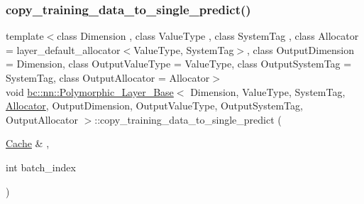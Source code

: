 \subsubsection{\texorpdfstring{copy\+\_\+training\+\_\+data\+\_\+to\+\_\+single\+\_\+predict()}{copy\_training\_data\_to\_single\_predict()}\hspace{0.1cm}{\footnotesize\ttfamily [1/2]}}
{\footnotesize\ttfamily template$<$class Dimension , class Value\+Type , class System\+Tag , class Allocator  = layer\+\_\+default\+\_\+allocator$<$\+Value\+Type, System\+Tag$>$, class Output\+Dimension  = Dimension, class Output\+Value\+Type  = Value\+Type, class Output\+System\+Tag  = System\+Tag, class Output\+Allocator  = Allocator$>$ \\
void \hyperlink{structbc_1_1nn_1_1Polymorphic__Layer__Base}{bc\+::nn\+::\+Polymorphic\+\_\+\+Layer\+\_\+\+Base}$<$ Dimension, Value\+Type, System\+Tag, \hyperlink{classbc_1_1allocators_1_1Allocator}{Allocator}, Output\+Dimension, Output\+Value\+Type, Output\+System\+Tag, Output\+Allocator $>$\+::copy\+\_\+training\+\_\+data\+\_\+to\+\_\+single\+\_\+predict (\begin{DoxyParamCaption}\item[{\hyperlink{structbc_1_1nn_1_1Cache}{Cache} \&}]{,  }\item[{int}]{batch\+\_\+index }\end{DoxyParamCaption})\hspace{0.3cm}{\ttfamily [inline]}}

\mbox{\label{structbc_1_1nn_1_1Polymorphic__Layer__Base_a1233eecaa679d32a0203c13870cbe564}} 
